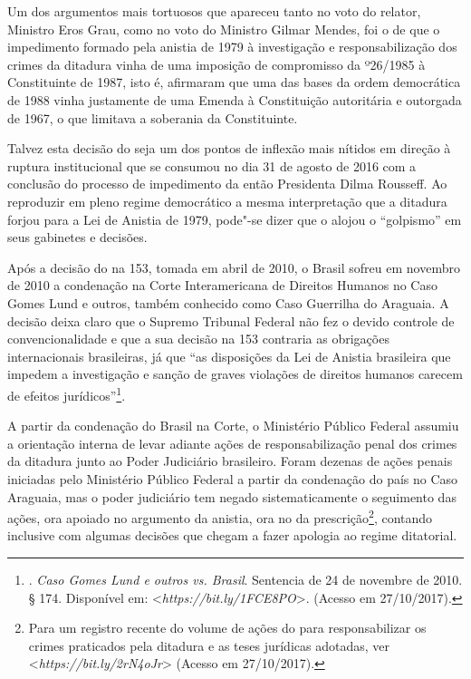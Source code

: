 Um dos argumentos mais tortuosos que apareceu tanto no voto do
relator, Ministro Eros Grau, como no voto do Ministro Gilmar Mendes, foi
o de que o impedimento formado pela anistia de 1979 à investigação e
responsabilização dos crimes da ditadura vinha de uma imposição de
compromisso da  º26/1985 à Constituinte de 1987, isto é, afirmaram
que uma das bases da ordem democrática de 1988 vinha justamente de uma
Emenda à Constituição autoritária e outorgada de 1967, o que limitava a
soberania da Constituinte.

Talvez esta decisão do  seja um dos pontos de inflexão mais nítidos
em direção à ruptura institucional que se consumou no dia 31 de agosto
de 2016 com a conclusão do processo de impedimento da então Presidenta
Dilma Rousseff. Ao reproduzir em pleno regime democrático a mesma
interpretação que a ditadura forjou para a Lei de Anistia de 1979,
pode"-se dizer que o  alojou o ``golpismo'' em seus gabinetes e
decisões.

Após a decisão do  na  153, tomada em abril de 2010, o Brasil
sofreu em novembro de 2010 a condenação na Corte Interamericana de
Direitos Humanos no Caso Gomes Lund e outros, também conhecido como Caso
Guerrilha do Araguaia. A decisão deixa claro que o Supremo Tribunal
Federal não fez o devido controle de convencionalidade e que a sua
decisão na  153 contraria as obrigações internacionais brasileiras,
já que ``as disposições da Lei de Anistia brasileira que impedem a
investigação e sanção de graves violações de direitos humanos carecem de
efeitos jurídicos''\footnote{.
  \emph{Caso Gomes Lund e outros vs. Brasil}. Sentencia de 24 de
  novembre de 2010. § 174. Disponível em:
  \textless{}\emph{https://bit.ly/1FCE8PO}\textgreater{}.
  (Acesso em 27/10/2017).}.

A partir da condenação do Brasil na Corte, o Ministério Público Federal
assumiu a orientação interna de levar adiante ações de responsabilização
penal dos crimes da ditadura junto ao Poder Judiciário brasileiro. Foram
dezenas de ações penais iniciadas pelo Ministério Público Federal a
partir da condenação do país no Caso Araguaia, mas o poder judiciário
tem negado sistematicamente o seguimento das ações, ora apoiado no
argumento da anistia, ora no da prescrição\footnote{Para um registro
  recente do volume de ações do  para responsabilizar os crimes
  praticados pela ditadura e as teses jurídicas adotadas, ver
  \textless{}\emph{https://bit.ly/2rN4oJr}\textgreater{}
  (Acesso em 27/10/2017).}, contando inclusive com algumas decisões que
chegam a fazer apologia ao regime ditatorial.

